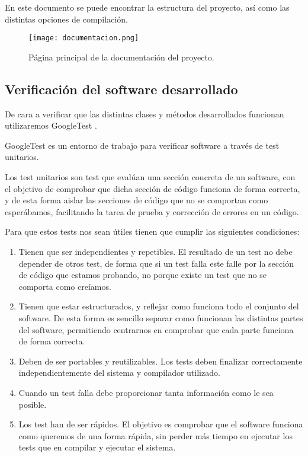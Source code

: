 En este documento se puede encontrar la estructura del proyecto, así como las distintas opciones de compilación.

\begin{figure}[H]
	 \centering
	 \texttt{[image: documentacion.png]}
	 \caption{Página principal de la documentación del proyecto.}
	\label{fig:documentación}
\end{figure}

\newpage

\subsection{Verificación del software desarrollado}

De cara a verificar que las distintas clases y métodos desarrollados funcionan utilizaremos GoogleTest \cite{gtest}.

GoogleTest es un entorno de trabajo para verificar software a través de test unitarios.

Los test unitarios son test que evalúan una sección concreta de un software, con el objetivo de comprobar que dicha sección de código funciona de forma correcta, y de esta forma aislar las secciones de código que no se comportan como esperábamos, facilitando la tarea de prueba y corrección de errores en un código.

Para que estos tests nos sean útiles tienen que cumplir las siguientes condiciones:

\begin{enumerate}
	\item Tienen que ser independientes y repetibles. El resultado de un test no debe depender de otros test, de forma que si un test falla este falle por la sección de código que estamos probando, no porque existe un test que no se comporta como creíamos.
	\item Tienen que estar estructurados, y reflejar como funciona todo el conjunto del software. De esta forma es sencillo separar como funcionan las distintas partes del software, permitiendo centrarnos en comprobar que cada parte funciona de forma correcta.
	\item Deben de ser portables y reutilizables. Los tests deben finalizar correctamente independientemente del sistema y compilador utilizado.
	\item Cuando un test falla debe proporcionar tanta información como le sea posible.
	\item Los test han de ser rápidos. El objetivo es comprobar que el software funciona como queremos de una forma rápida, sin perder más tiempo en ejecutar los tests que en compilar y ejecutar el sistema.
\end{enumerate}

